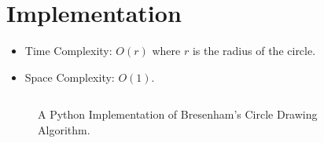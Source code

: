 \documentclass{article}
\begin{document}

\clearpage
\section{Implementation}

\begin{itemize}
    \item Time Complexity: \(O(r)\) where \(r\) is the radius of the circle.
    \item Space Complexity: \(O(1)\).
\end{itemize}

\begin{figure}[H]
    \inputminted{python}{bresenham.py}
    \caption*{A Python Implementation of Bresenham's Circle Drawing Algorithm.}
\end{figure}

\end{document}
